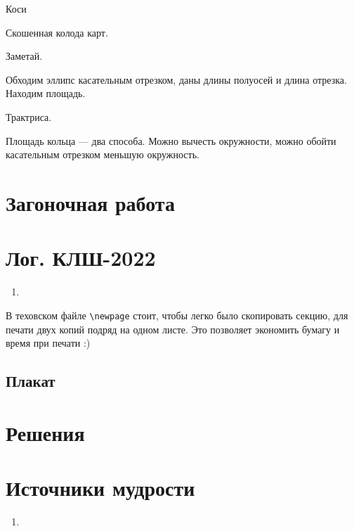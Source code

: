\documentclass[12pt]{article}
\newcounter{problem}[section]
\theoremstyle{definition}
\begin{document}
Коси

Скошенная колода карт.

Заметай.

Обходим эллипс касательным отрезком, даны длины полуосей и длина отрезка. Находим площадь.

Трактриса. 

Площадь кольца — два способа. Можно вычесть окружности, можно обойти касательным отрезком меньшую окружность. 


\section{Загоночная работа}




\newpage

\section{Лог. КЛШ-2022}

\begin{enumerate}
  \item 
\end{enumerate}

В теховском файле \verb|\newpage| стоит, чтобы легко было скопировать секцию, для печати двух копий подряд на одном листе.
Это позволяет экономить бумагу и время при печати :)

\subsection{Плакат}






\renewenvironment{solution}[1]{%
         \vskip .5cm plus 2cm minus 0.1cm%
         {\bfseries \hyperlink{problem:#1}{#1.}}%
}%
{%
}%



\section{Решения}



\section{Источники мудрости}


\begin{enumerate}
\item 
\end{enumerate}

\printbibliography[heading=none]
\end{document}
